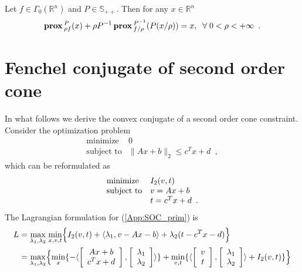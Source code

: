 \documentclass[openany]{now}
\newcommand{\reals}{{\mathbb R}}
\newcommand{\psd}{{\mathbb S}}
\newcommand{\prox}{\mathop{\bf prox}}
\begin{document}
\begin{lemma}{\label{App.:genMoreau}}
 Let $f\in \Gamma_0(\reals^n)$ and $P\in\psd_{++}$. Then for any $x\in\reals^n$
 \[
  \prox{_{\rho f}^{P}}(x) + \rho P^{-1}\prox{_{f/\rho}^{P^{-1}}}(P(x/\rho)) = x, \;\; \forall\; 0 < \rho < +\infty\enspace.
 \]
\end{lemma}


\iffalse
\section{Fenchel conjugate of second order cone}
In what follows we derive the convex conjugate of a second order cone constraint. Consider the optimization problem
    \begin{equation}   
    \begin{array}{ll}
      \mbox{minimize} & 0 \\
      \mbox{subject to} & \|Ax+b\|_2 \le c^Tx+d\enspace,
    \end{array}
    \end{equation}
which can be reformulated as
    \begin{equation}{\label{App:SOC_prim}}
    \begin{array}{ll}
      \mbox{minimize} & I_2(v,t) \\
      \mbox{subject to} & v = Ax+b \\
                \quad & t = c^Tx+d \enspace.
    \end{array}
    \end{equation}
The Lagrangian formulation for (\ref{App:SOC_prim}) is
\begin{align}
L \nonumber&= \underset{\lambda_1,\lambda_2}{\max} \; \underset{x,v,t}{\min} \Big\{I_2(v,t) + \langle \lambda_1,v-Ax-b\rangle  + \lambda_2(t-c^Tx-d)\Big\}\\
  &= \underset{\lambda_1,\lambda_2}{\max} \Big\{ \underset{x}{\min} \{-\langle \left[\begin{array}{c}Ax+b\\c^Tx+d\end{array}\right],\left[\begin{array}{c}\lambda_1\\\lambda_2\end{array}\right]\rangle \} + \underset{v,t}{\min} \{ \langle \left[\begin{array}{c}v\\t\end{array}\right],\left[\begin{array}{c}\lambda_1\\\lambda_2\end{array}\right]\rangle  + I_2(v,t)\}\Big\}{\label{App:lagrang}}
\end{align}
\end{document}
